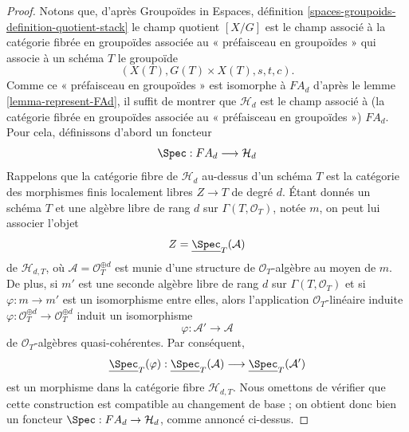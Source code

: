 \begin{proof}
Notons que, d'après
Groupoïdes in Espaces, définition
\ref{spaces-groupoids-definition-quotient-stack}
le champ quotient $[X/G]$ est le champ associé à la
catégorie fibrée en groupoïdes associée au « préfaisceau en groupoïdes »
qui associe à un schéma $T$ le groupoïde
$$
(X(T), G(T) \times X(T), s, t, c).
$$
Comme ce « préfaisceau en groupoïdes » est isomorphe à $FA_d$ d'après le
lemme \ref{lemma-represent-FAd},
il suffit de montrer que $\mathcal{H}_d$ est le champ associé
à (la catégorie fibrée en groupoïdes associée au
« préfaisceau en groupoïdes ») $FA_d$. Pour cela, définissons d'abord un
foncteur
$$
\Spec : FA_d \longrightarrow \mathcal{H}_d
$$
Rappelons que la catégorie fibre de $\mathcal{H}_d$ au-dessus d'un schéma $T$
est la catégorie des morphismes finis localement libres $Z \to T$ de degré $d$.
Étant donnés un schéma $T$ et une algèbre libre de rang $d$
sur $\Gamma(T, \mathcal{O}_T)$, notée $m$, on peut lui associer l'objet
$$
Z = \underline{\Spec}_T(\mathcal{A})
$$
de $\mathcal{H}_{d, T}$,
où $\mathcal{A} = \mathcal{O}_T^{\oplus d}$ est munie d'une
structure de $\mathcal{O}_T$-algèbre au moyen de $m$. De plus, si $m'$ est
une seconde algèbre libre de rang $d$ sur $\Gamma(T, \mathcal{O}_T)$
et si $\varphi : m \to m'$ est un isomorphisme entre elles, alors
l'application $\mathcal{O}_T$-linéaire induite
$\varphi : \mathcal{O}_T^{\oplus d} \to \mathcal{O}_T^{\oplus d}$
induit un isomorphisme
$$
\varphi : \mathcal{A}' \longrightarrow \mathcal{A}
$$
de $\mathcal{O}_T$-algèbres quasi-cohérentes. Par conséquent,
$$
\underline{\Spec}_T(\varphi) :
\underline{\Spec}_T(\mathcal{A})
\longrightarrow
\underline{\Spec}_T(\mathcal{A}')
$$
est un morphisme dans la catégorie fibre $\mathcal{H}_{d, T}$. Nous omettons de
vérifier que cette construction est compatible au changement de base ; on
obtient donc bien un foncteur $\Spec : FA_d \to \mathcal{H}_d$,
comme annoncé ci-dessus.


\end{proof}
